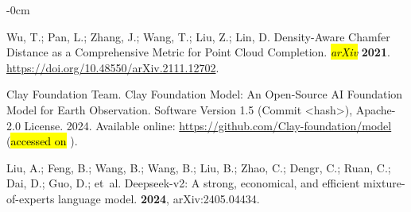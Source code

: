 \documentclass[remotesensing,article,accept,pdftex,moreauthors]{Definitions/mdpi}
\begin{document}
\begin{adjustwidth}{-\extralength}{0cm}
\begin{thebibliography}{999}
Wu, T.; Pan, L.; Zhang, J.; Wang, T.; Liu, Z.; Lin, D.
\newblock Density-Aware Chamfer Distance as a Comprehensive Metric for Point
  Cloud Completion. \emph{\hl{arXiv} %
}  \textbf{2021}.
  {\url{https://doi.org/10.48550/arXiv.2111.12702}}.

{Clay Foundation Team}.
\newblock Clay Foundation Model: An Open-Source AI Foundation Model for Earth
  Observation. Software Version 1.5 (Commit <hash>), Apache-2.0 License. 2024. Available online:
\newblock \url{https://github.com/Clay-foundation/model} (\hl{accessed on}%
).

Liu, A.; Feng, B.; Wang, B.; Wang, B.; Liu, B.; Zhao, C.; Dengr, C.; Ruan, C.;
  Dai, D.; Guo, D.;  et~al.
\newblock Deepseek-v2: A strong, economical, and efficient mixture-of-experts
  language model.
 {\bf 2024}, arXiv:2405.04434.

\end{thebibliography}

  \PublishersNote{}
  \end{adjustwidth}

\end{document}
